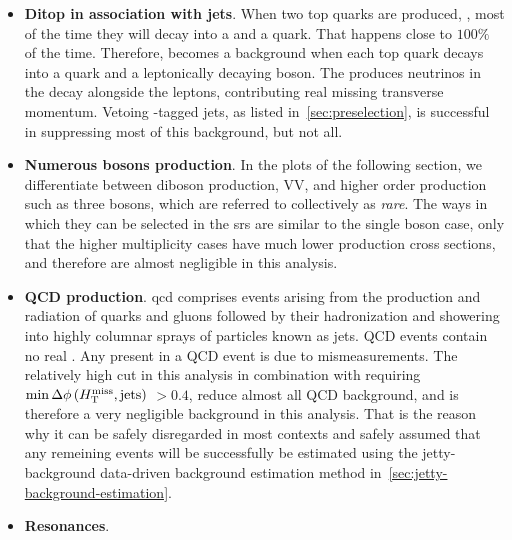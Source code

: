 \begin{itemize}
\item \textbf{Ditop in association with jets}. When two top quarks are produced, \ttbar, most of the time they will decay into a \PW and a \PQb quark. That happens close to $100\%$ of the time. Therefore, \ttbar becomes a background when each top quark decays into a \PQb quark and a leptonically decaying \PW boson. The \PW produces neutrinos in the decay alongside the leptons, contributing real missing transverse momentum. Vetoing \PQb-tagged jets, as listed in~\ref{sec:preselection}, is successful in suppressing most of this background, but not all.

\item \textbf{Numerous bosons production}. In the plots of the following section, we differentiate between diboson production, VV, and higher order production such as three bosons, which are referred to collectively as \emph{rare}. The ways in which they can be selected in the \glspl{sr} are similar to the single boson case, only that the higher multiplicity cases have much lower production cross sections, and therefore are almost negligible in this analysis.

\item \textbf{QCD production}. \gls{qcd} comprises events arising from the production and radiation of quarks and gluons followed by their hadronization and showering into highly columnar sprays of particles known as jets. QCD events contain no real \MET. Any \MET present in a QCD event is due to mismeasurements. The relatively high \MET cut in this analysis in combination with requiring $\min{\Delta\phi\left(\ensuremath{H_{\mathrm{T}}^{\text{miss}}},\mathrm{jets}\right)}$  $ > 0.4$, reduce almost all QCD background, and is therefore a very negligible background in this analysis. That is the reason why it can be safely disregarded in most contexts and safely assumed that any remeining events will be successfully be estimated using the jetty-background data-driven background estimation method in~\ref{sec:jetty-background-estimation}.

\item \textbf{Resonances}. 


\end{itemize}

